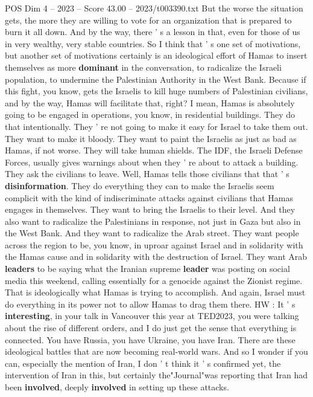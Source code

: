 \begin{textsample}{POS Dim 4 – 2023 – Score 43.00 – 2023/t003390.txt}
But the worse the situation gets, the more they are willing to vote for an organization that is prepared to burn it all down.
And by the way, there ' s a lesson in that, even for those of us in very wealthy, very stable countries.
So I think that ' s one set of motivations, but another set of motivations certainly is an ideological effort of Hamas to insert themselves as more \textbf{dominant} in the conversation, to radicalize the Israeli population, to undermine the Palestinian Authority in the West Bank.
Because if this fight, you know, gets the Israelis to kill huge numbers of Palestinian civilians, and by the way, Hamas will facilitate that, right?
I mean, Hamas is absolutely going to be engaged in operations, you know, in residential buildings.
They do that intentionally.
They ' re not going to make it easy for Israel to take them out.
They want to make it bloody.
They want to paint the Israelis as just as bad as Hamas, if not worse.
They will take human shields.
The IDF, the Israeli Defense Forces, usually gives warnings about when they ' re about to attack a building.
They ask the civilians to leave.
Well, Hamas tells those civilians that that ' s \textbf{disinformation}.
They do everything they can to make the Israelis seem complicit with the kind of indiscriminate attacks against civilians that Hamas engages in themselves.
They want to bring the Israelis to their level.
And they also want to radicalize the Palestinians in response, not just in Gaza but also in the West Bank.
And they want to radicalize the Arab street.
They want people across the region to be, you know, in uproar against Israel and in solidarity with the Hamas cause and in solidarity with the destruction of Israel.
They want Arab \textbf{leaders} to be saying what the Iranian supreme \textbf{leader} was posting on social media this weekend, calling essentially for a genocide against the Zionist regime.
That is ideologically what Hamas is trying to accomplish.
And again, Israel must do everything in its power not to allow Hamas to drag them there.
HW : It ' s \textbf{interesting}, in your talk in Vancouver this year at TED2023, you were talking about the rise of different orders, and I do just get the sense that everything is connected.
You have Russia, you have Ukraine, you have Iran.
There are these ideological battles that are now becoming real-world wars.
And so I wonder if you can, especially the mention of Iran, I don ' t think it ' s confirmed yet, the intervention of Iran in this, but certainly the"Journal"was reporting that Iran had been \textbf{involved}, deeply \textbf{involved} in setting up these attacks.

\end{textsample}
